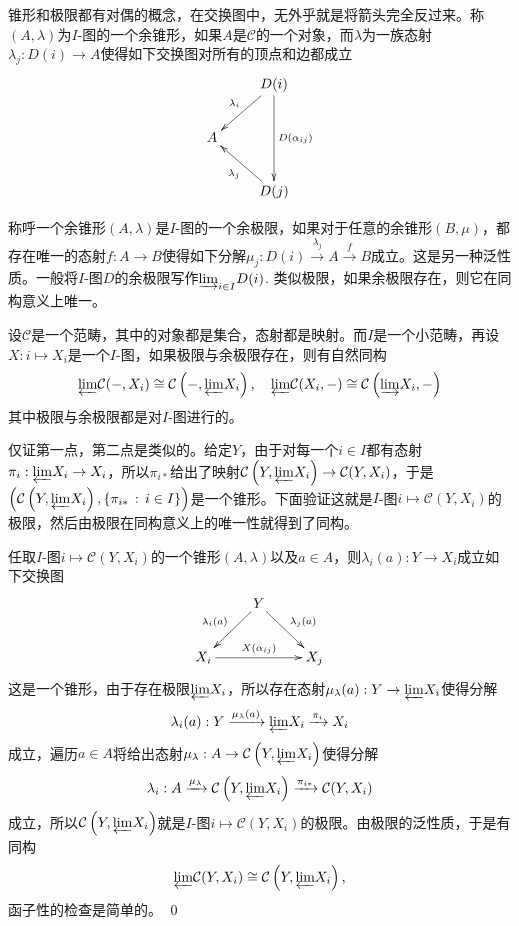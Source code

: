 \para 锥形和极限都有对偶的概念，在交换图中，无外乎就是将箭头完全反过来。称$(A,\lambda)$为$I$-图的一个{余锥形}，如果$A$是$\mathcal{C}$的一个对象，而$\lambda$为一族态射$\lambda_{j}:D(i)\to A$使得如下交换图对所有的顶点和边都成立
\[
	\xymatrix{
		&D(i)\ar[ld]_{\lambda_i}\ar[dd]^{D(\alpha_{ij})}\\
		A&\\
		&D(j)\ar[lu]^{\lambda_j}
	}
\]

称呼一个余锥形$(A,\lambda)$是$I$-图的一个{余极限}，如果对于任意的余锥形$(B,\mu)$，都存在唯一的态射$f:A\to B$使得如下分解$\mu_j:D(i)\xrightarrow{\lambda_j}A\xrightarrow{f}B$成立。这是另一种泛性质。一般将$I$-图$D$的余极限写作${\varinjlim}_{i\in I} D(i)$. 类似极限，如果余极限存在，则它在同构意义上唯一。

\pro \label{homlimit}设$\mathcal{C}$是一个范畴，其中的对象都是集合，态射都是映射。而$I$是一个小范畴，再设$X:i\mapsto X_i$是一个$I$-图，如果极限与余极限存在，则有自然同构
\[
	{\varprojlim} \mathcal{C}(-,X_i)\cong \mathcal{C}\left(-,{\varprojlim} X_i\right),\quad {\varprojlim} \mathcal{C}(X_i,-)\cong  \mathcal{C}\left({\varinjlim} X_i,-\right)
\]
其中极限与余极限都是对$I$-图进行的。

\proof
	仅证第一点，第二点是类似的。给定$Y$，由于对每一个$i\in I$都有态射$\pi_i: {\varprojlim} X_i\to X_i$，所以$\pi_{i*}$给出了映射$\mathcal{C}\left(Y,{\varprojlim} X_i\right)\to \mathcal{C}(Y,X_i)$，于是$\left(\mathcal{C}\left(Y,{\varprojlim} X_i\right),\{\pi_{i*}\,:\, i\in I\}\right)$是一个锥形。下面验证这就是$I$-图$i\mapsto \mathcal{C}(Y,X_i)$的极限，然后由极限在同构意义上的唯一性就得到了同构。

	任取$I$-图$i\mapsto \mathcal{C}(Y,X_i)$的一个锥形$(A,\lambda)$以及$a\in A$，则$\lambda_i(a):Y\to X_i$成立如下交换图
	\[
		\xymatrix{
			&Y \ar[dl]_{\lambda_{i}(a)}\ar[dr]^{\lambda_{j}(a)}&\\
			X_i\ar[rr]^{X(\alpha_{ij})}&&X_j
		}
	\]
	这是一个锥形，由于存在极限${\varprojlim} X_i$，所以存在态射$\mu_\lambda(a):Y\to {\varprojlim} X_i$使得分解
	\[
		\lambda_i(a):Y\xrightarrow{\mu_\lambda(a)}{\varprojlim} X_i\xrightarrow{\pi_i}X_i
	\]
	成立，遍历$a\in A$将给出态射$\mu_\lambda:A\to \mathcal{C}\left(Y,{\varprojlim} X_i\right)$使得分解
	\[
	\lambda_i: A\xrightarrow{\mu_\lambda}\mathcal{C}\left(Y,{\varprojlim} X_i\right)\xrightarrow{\pi_{i*}}\mathcal{C}(Y,X_i)
	\]
	成立，所以$\mathcal{C}\left(Y,{\varprojlim} X_i\right)$就是$I$-图$i\mapsto \mathcal{C}(Y,X_i)$的极限。由极限的泛性质，于是有同构
	\[
		{\varprojlim} \mathcal{C}(Y,X_i)\cong \mathcal{C}\left(Y,{\varprojlim} X_i\right),
	\]
	函子性的检查是简单的。
\qed

